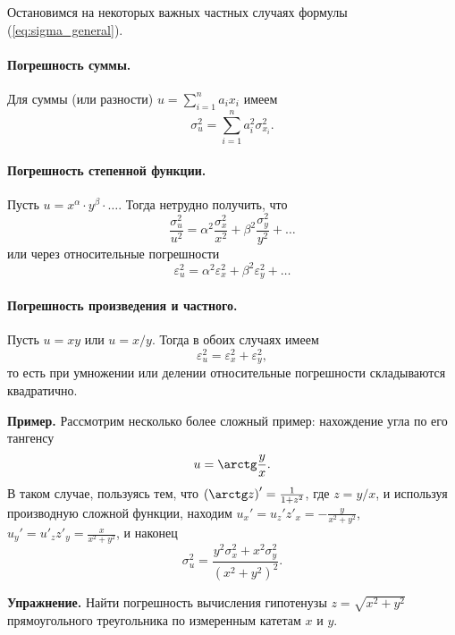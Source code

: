 Остановимся на некоторых важных частных случаях формулы (\ref{eq:sigma_general}).

\paragraph{Погрешность суммы.}

Для суммы (или разности) $u=\sum\limits _{i=1}^{n}a_{i}x_{i}$ имеем
\begin{equation}
\sigma_{u}^{2}=\sum_{i=1}^{n}a_{i}^{2}\sigma_{x_{i}}^{2}.
\end{equation}


\paragraph{Погрешность степенной функции.}

Пусть $u=x^{\alpha}\cdot y^{\beta}\cdot\ldots$. Тогда нетрудно получить,
что
\[
\frac{\sigma_{u}^{2}}{u^{2}}=\alpha^{2}\frac{\sigma_{x}^{2}}{x^{2}}+\beta^{2}\frac{\sigma_{y}^{2}}{y^{2}}+\ldots
\]
или через относительные погрешности
\begin{equation}
\varepsilon_{u}^{2}=\alpha^{2}\varepsilon_{x}^{2}+\beta^{2}\varepsilon_{y}^{2}+\ldots\label{eq:espilon_power}
\end{equation}


\paragraph{Погрешность произведения и частного.}

Пусть $u=xy$ или $u=x/y$. Тогда в обоих случаях имеем
\begin{equation}
\varepsilon_{u}^{2}=\varepsilon_{x}^{2}+\varepsilon_{y}^{2},
\end{equation}
то есть при умножении или делении относительные погрешности складываются
квадратично.

{\footnotesize
\textbf{Пример.} Рассмотрим несколько
более сложный пример: нахождение угла по его тангенсу 
\[
u=\arctg\frac{y}{x}.
\]
В таком случае, пользуясь тем, что $\left(\arctg z\right)'=\frac{1}{1+z^{2}}$,
где $z=y/x$, и используя производную сложной функции, находим $u_{x}'=u_{z}'z'_{x}=-\frac{y}{x^{2}+y^{2}}$,
$u_{y}'=u'_{z}z'_{y}=\frac{x}{x^{2}+y^{2}}$, и наконец 
\[
\sigma_{u}^{2}=\frac{y^{2}\sigma_{x}^{2}+x^{2}\sigma_{y}^{2}}{\left(x^{2}+y^{2}\right)^{2}}.
\]
}%

{\footnotesize
\textbf{Упражнение.} Найти погрешность
вычисления гипотенузы $z=\sqrt{x^{2}+y^{2}}$ прямоугольного треугольника
по измеренным катетам $x$ и $y$.\par
}%

